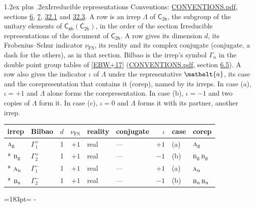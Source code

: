 \documentclass[10pt,a4paper]{article}
\makeatletter
\renewcommand\section{\@startsection{section}{1}{\z@}{-3ex plus -1ex minus -.2ex}%
  {1.2ex plus .2ex}{\normalfont\large\sffamily\bfseries\color{parttitle}}}
\newcommand{\needspace}[1]{\par\penalty-100\begingroup\dimen0=#1\relax\dimen2=\pagegoal
  \advance\dimen2-\pagetotal\ifdim\dimen0>\dimen2\relax\ifdim\dimen2>0pt\vfil\break\fi\fi
  \endgroup}
\numberwithin{equation}{section}
\newcommand{\eltfont}[1]{{\let\sigma\eltsigma\mathelt{#1}}}
\newcommand{\grp}[1]{\mathsf{#1}}
\newcommand{\irr}[1]{\text{\normalfont\scshape #1}}
\newcommand{\elt}[1]{\eltfont{#1}}
\newcommand{\ptag}[1]{\mathrm{#1}}
\newcommand{\fsind}{\nu_{\mathrm{FS}}}
\makeatother
\begin{document}
\section{Irreducible representations}\label{s:irreps}
Conventions: \href{../../CONVENTIONS.pdf}{CONVENTIONS.pdf}, sections \href{../../../rotation/CONVENTIONS.pdf\#conv.6}{6}, \href{../../../rotation/CONVENTIONS.pdf\#conv.7}{7}, \href{../../CONVENTIONS.pdf\#conv.32.1}{32.1} and \href{../../CONVENTIONS.pdf\#conv.32.3}{32.3}.
\leavevmode\label{n:irrep.Delta}A row is an irrep $\Lambda$ of $\grp{C_{2h}}$, the subgroup of the unitary elements of $\grp{C_{4h}}(\grp{C_{2h}})$, in the order of the section Irreducible representations of the document of \href{../../../rotation/data/pdf/C2h.pdf}{$\grp{C_{2h}}$}. \label{n:index.dimension}\label{n:index.frobenius}\label{n:head.irrep}\label{n:head.reality}\label{n:head.conjugate}A row gives its dimension $d$, its Frobenius--Schur indicator $\fsind$, its reality and its complex conjugate (conjugate, a dash for the others), as in that section. \label{n:head.bilbao}\label{n:irrep.alias.gamma}Bilbao is the irrep's symbol $\Gamma_n$ in the double point group tables of [\href{../../../REFERENCES.pdf\#ref.EBW+17}{EBW+17}] (\href{../../CONVENTIONS.pdf}{CONVENTIONS.pdf}, section \href{../../../rotation/CONVENTIONS.pdf\#conv.6.5}{6.5}). \label{n:head.case.corep}\label{n:head.corep}A row also gives the indicator $\iota$ of $\Lambda$ under the representative $\elt{a}$, its case and the corepresentation that contains it (corep), named by its irreps. In case (a), $\iota = +1$ and $\Lambda$ alone forms the corepresentation. In case (b), $\iota = -1$ and two copies of $\Lambda$ form it. In case (c), $\iota = 0$ and $\Lambda$ forms it with its partner, another irrep.
\setlength{\emergencystretch}{2em}\par\setlength{\emergencystretch}{0pt}
{\small\renewcommand{\arraystretch}{1.25}\setlength{\tabcolsep}{4pt}\begin{longtable}{@{}llrrllrll@{}}\toprule
irrep & Bilbao & $d$ & $\fsind$ & reality & conjugate & $\iota$ & case & corep\\\midrule\endhead
\bottomrule\endfoot\endlastfoot
$\irr{a}_{\ptag{g}}$ & $\Gamma_{1}^{+}$ & 1 & $+1$ & real & --- & $+1$ & (a) & $\irr{a}_{\ptag{g}}$\\*
$\irr{b}_{\ptag{g}}$ & $\Gamma_{2}^{+}$ & 1 & $+1$ & real & --- & $-1$ & (b) & $\irr{b}_{\ptag{g}}\,\irr{b}_{\ptag{g}}$\\*
$\irr{a}_{\ptag{u}}$ & $\Gamma_{1}^{-}$ & 1 & $+1$ & real & --- & $+1$ & (a) & $\irr{a}_{\ptag{u}}$\\*
$\irr{b}_{\ptag{u}}$ & $\Gamma_{2}^{-}$ & 1 & $+1$ & real & --- & $-1$ & (b) & $\irr{b}_{\ptag{u}}\,\irr{b}_{\ptag{u}}$\\
\bottomrule\end{longtable}}
\needspace{183pt}
\end{document}
